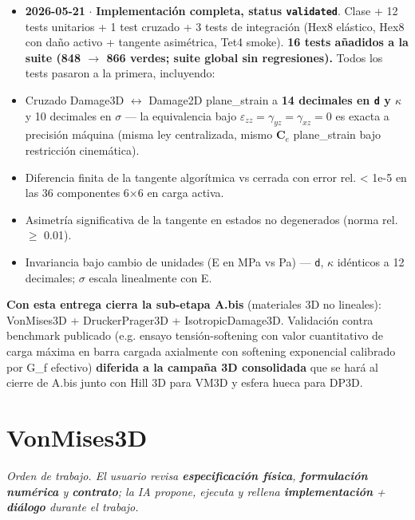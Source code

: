 \documentclass[11pt,letterpaper,oneside]{report}
\begin{document}
\begin{itemize}
  \item \textbf{2026-05-21} \ensuremath{\cdot} \textbf{Implementación completa, status \texttt{validated}}. Clase + 12 tests unitarios + 1 test cruzado + 3 tests de integración (Hex8 elástico, Hex8 con daño activo + tangente asimétrica, Tet4 smoke). \textbf{16 tests añadidos a la suite (848 \ensuremath{\to} 866 verdes; suite global sin regresiones).} Todos los tests pasaron a la primera, incluyendo:
  \item Cruzado Damage3D \ensuremath{\leftrightarrow} Damage2D plane\_strain a \textbf{14 decimales en \texttt{d} y \texttt{\ensuremath{\kappa}}} y 10 decimales en \ensuremath{\sigma} --- la equivalencia bajo $\varepsilon_{zz} = \gamma_{yz} = \gamma_{xz} = 0$ es exacta a precisión máquina (misma ley centralizada, mismo $\mathbf C_e$ plane\_strain bajo restricción cinemática).
  \item Diferencia finita de la tangente algorítmica vs cerrada con error rel. < 1e-5 en las 36 componentes 6\ensuremath{\times}6 en carga activa.
  \item Asimetría significativa de la tangente en estados no degenerados (norma rel. \ensuremath{\ge} 0.01).
  \item Invariancia bajo cambio de unidades (E en MPa vs Pa) --- \texttt{d}, \texttt{\ensuremath{\kappa}} idénticos a 12 decimales; \ensuremath{\sigma} escala linealmente con E.
\end{itemize}

  \textbf{Con esta entrega cierra la sub-etapa A.bis} (materiales 3D no lineales): VonMises3D + DruckerPrager3D + IsotropicDamage3D. Validación contra benchmark publicado (e.g. ensayo tensión-softening con valor cuantitativo de carga máxima en barra cargada axialmente con softening exponencial calibrado por G\_f efectivo) \textbf{diferida a la campaña 3D consolidada} que se hará al cierre de A.bis junto con Hill 3D para VM3D y esfera hueca para DP3D.


\newpage

\section{VonMises3D}



\textit{Orden de trabajo. El usuario revisa \textbf{especificación física}, \textbf{formulación numérica} y \textbf{contrato}; la IA propone, ejecuta y rellena \textbf{implementación} + \textbf{diálogo} durante el trabajo.}
\end{document}
